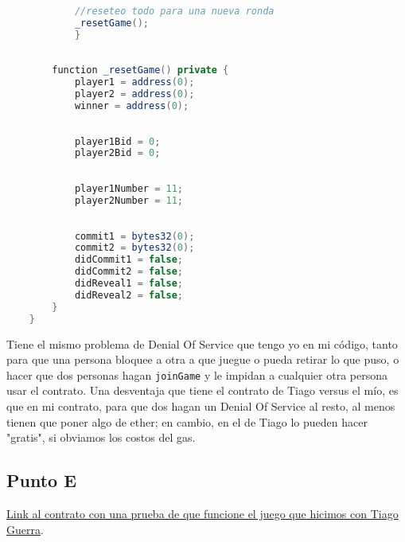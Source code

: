 \documentclass[12pt]{article}
\begin{document}
\begin{lstlisting}[language=Java]
    
            //reseteo todo para una nueva ronda
            _resetGame();
            }
    
    
        function _resetGame() private {
            player1 = address(0);
            player2 = address(0);
            winner = address(0);
    
    
            player1Bid = 0;
            player2Bid = 0;
    
    
            player1Number = 11;
            player2Number = 11;
    
    
            commit1 = bytes32(0);
            commit2 = bytes32(0);
            didCommit1 = false;
            didCommit2 = false;
            didReveal1 = false;
            didReveal2 = false;
        }
    }
\end{lstlisting}
Tiene el mismo problema de Denial Of Service que tengo yo en mi código, tanto para que una persona bloquee a otra a que juegue o pueda retirar lo que puso, o hacer que dos personas hagan \texttt{joinGame} y le impidan a cualquier otra persona usar el contrato. Una desventaja que tiene el contrato de Tiago versus el mío, es que en mi contrato, para que dos hagan un Denial Of Service al resto, al menos tienen que poner algo de ether; en cambio, en el de Tiago lo pueden hacer "gratis", si obviamos los costos del gas. 

\subsection*{Punto E}
\href{https://sepolia.etherscan.io/address/0x52ad35083f7be6a2d0a96dff34a7940694ec223f}{Link al contrato con una prueba de que funcione el juego que hicimos con Tiago Guerra}.
\end{document}
